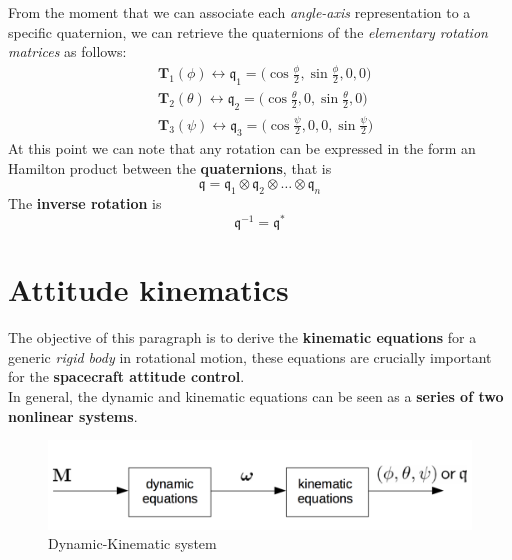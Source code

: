\noindent
From the moment that we can associate each \textit{angle-axis} representation to a specific quaternion, we can retrieve the quaternions of the \textit{elementary rotation matrices} as follows:
{\Large{
    \begin{align*}
        &\mathbf{T}_1(\phi) \longleftrightarrow
        \mathfrak{q}_1 = \bigg(\cos \frac{\phi}{2}, \sin \frac{\phi}{2}, 0, 0 \bigg)\\
        &\mathbf{T}_2(\theta) \longleftrightarrow 
        \mathfrak{q}_2=\bigg(\cos \frac{\theta}{2}, 0, \sin \frac{\theta}{2}, 0 \bigg)\\
        &\mathbf{T}_3(\psi) \longleftrightarrow 
        \mathfrak{q}_3=\bigg(\cos \frac{\psi}{2}, 0, 0, \sin\frac{\psi}{2} \bigg)
    \end{align*}
}}
At this point we can note that any rotation can be expressed in the form an Hamilton product between the \textbf{quaternions}, that is 
{\Large{
    \begin{equation*}
        \mathfrak{q} = 
        \mathfrak{q}_1 \otimes
        \mathfrak{q}_2 \otimes
        \dots \otimes
        \mathfrak{q}_n
    \end{equation*}
}}
The \textbf{inverse rotation} is
{\Large{
    \begin{equation*}
        \mathfrak{q}^{-1} = \mathfrak{q}^*
    \end{equation*}
}}

\section{Attitude kinematics}
The objective of this paragraph is to derive the \textbf{kinematic equations} for a generic \textit{rigid body} in rotational motion, these equations are crucially important for the \textbf{spacecraft attitude control}.\\
In general, the dynamic and kinematic equations can be seen as a \textbf{series of two nonlinear systems}.

\begin{figure}[h]
    \centering 
    \includegraphics[scale=0.7]{AerospaceApplications/images/kin_dyn_series.png}
    \caption{Dynamic-Kinematic system}
\end{figure}


